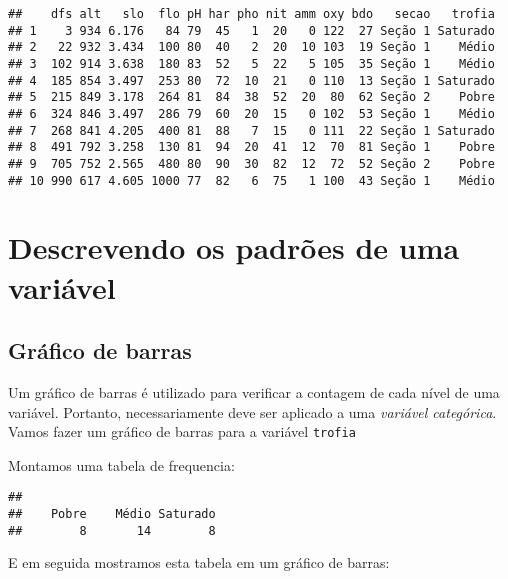 \documentclass[
]{book}
\newenvironment{Shaded}{\begin{snugshade}}{\end{snugshade}}
\newcommand{\FunctionTok}[1]{\textcolor[rgb]{0.00,0.00,0.00}{#1}}
\newcommand{\NormalTok}[1]{#1}
\newcommand{\OtherTok}[1]{\textcolor[rgb]{0.56,0.35,0.01}{#1}}
\newcommand{\SpecialCharTok}[1]{\textcolor[rgb]{0.00,0.00,0.00}{#1}}
\begin{document}
\begin{verbatim}
##    dfs alt   slo  flo pH har pho nit amm oxy bdo   secao   trofia
## 1    3 934 6.176   84 79  45   1  20   0 122  27 Seção 1 Saturado
## 2   22 932 3.434  100 80  40   2  20  10 103  19 Seção 1    Médio
## 3  102 914 3.638  180 83  52   5  22   5 105  35 Seção 1    Médio
## 4  185 854 3.497  253 80  72  10  21   0 110  13 Seção 1 Saturado
## 5  215 849 3.178  264 81  84  38  52  20  80  62 Seção 2    Pobre
## 6  324 846 3.497  286 79  60  20  15   0 102  53 Seção 1    Médio
## 7  268 841 4.205  400 81  88   7  15   0 111  22 Seção 1 Saturado
## 8  491 792 3.258  130 81  94  20  41  12  70  81 Seção 1    Pobre
## 9  705 752 2.565  480 80  90  30  82  12  72  52 Seção 2    Pobre
## 10 990 617 4.605 1000 77  82   6  75   1 100  43 Seção 1    Médio
\end{verbatim}

\hypertarget{descrevendo-os-padruxf5es-de-uma-variuxe1vel}{%
\section{Descrevendo os padrões de uma variável}\label{descrevendo-os-padruxf5es-de-uma-variuxe1vel}}

\hypertarget{gruxe1fico-de-barras}{%
\subsection{Gráfico de barras}\label{gruxe1fico-de-barras}}

Um gráfico de barras é utilizado para verificar a contagem de cada nível de uma variável. Portanto, necessariamente deve ser aplicado a uma \emph{variável categórica}. Vamos fazer um gráfico de barras para a variável \texttt{trofia}

Montamos uma tabela de frequencia:

\begin{Shaded}
\end{Shaded}

\begin{verbatim}
## 
##    Pobre    Médio Saturado 
##        8       14        8
\end{verbatim}

E em seguida mostramos esta tabela em um gráfico de barras:
\end{document}

